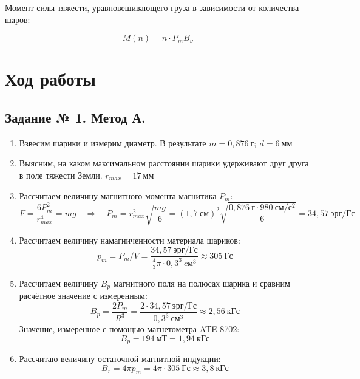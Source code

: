 Момент силы тяжести, уравновешивающего груза в зависимости от количества шаров:

\begin{equation*}
	M(n) = n \cdot P_mB_{\nu}
\end{equation*}

\section*{{Ход работы}}
\subsection*{Задание № 1. Метод А.}
\begin{enumerate}
\item Взвесим шарики и измерим диаметр. В результате $m = 0,876 \ г; \ d = 6 \ мм$ \\
\item Выясним, на каком максимальном расстоянии шарики удерживают друг друга в поле тяжести Земли. $r_{max} = 17 \ мм$\\
\item Рассчитаем величину магнитного момента магнитика $P_m$:\\
\[
F = \frac{6P_m^2}{r_{max}^4} = mg \quad \Rightarrow \quad \boxed{P_m = r_{max}^2 \sqrt{\frac{mg}{6}} = (1,7 \ см)^2 \sqrt{\frac{0,876 \ г \cdot 980 \ см/с^2}{6}} = 34,57 \ эрг/Гс }
\]
\item Рассчитаем величину намагниченности материала шариков:
\[
\boxed{p_m = P_m/V = \frac{34,57 \ эрг/Гс }{\frac{4}{3} \pi \cdot 0,3^3\ cм^3} \approx 305 \ Гс}
\]

\item Рассчитаем величину $B_p$ магнитного поля на полюсах шарика и сравним расчётное значение с измеренным: \\
\[
\boxed{B_p = \frac{2P_m}{R^3} = \frac{2 \cdot 34,57 \ эрг/Гс }{0,3^3 \ см^3} \approx 2,56 \ кГс}
\]
Значение, измеренное с помощью магнетометра ATE-8702: \\
\[
\boxed{B_p = 194 \ мТ = 1,94 \ кГс}
\]
\item Рассчитаю величину остаточной магнитной индукции: \\
\[
\boxed{B_r = 4\pi p_m = 4\pi \cdot 305 \ Гс \approx 3,8 \ кГс}
\]



\end{enumerate}
